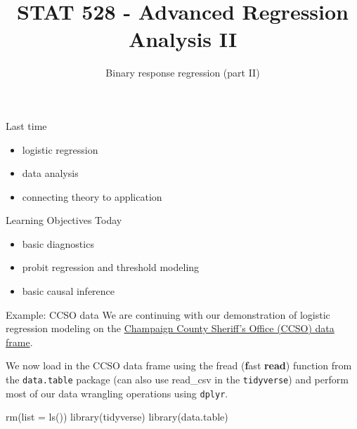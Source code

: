 \documentclass[
  ignorenonframetext,
]{beamer}
\title{STAT 528 - Advanced Regression Analysis II}
\author{Binary response regression (part II)}
\date{}
\institute{Daniel J. Eck\\
Department of Statistics\\
University of Illinois}
\newenvironment{Shaded}{\begin{snugshade}}{\end{snugshade}}
\newcommand{\AttributeTok}[1]{\textcolor[rgb]{0.77,0.63,0.00}{#1}}
\newcommand{\FunctionTok}[1]{\textcolor[rgb]{0.00,0.00,0.00}{#1}}
\newcommand{\NormalTok}[1]{#1}
\providecommand{\tightlist}{%
  \setlength{\itemsep}{0pt}\setlength{\parskip}{0pt}}
\begin{document}
\frame{\titlepage}

\begin{frame}
\newcommand{\R}{\mathbb{R}}
\newcommand{\Prob}{\mathbb{P}}
\newcommand{\Proj}{\textbf{P}}
\newcommand{\Hcal}{\mathcal{H}}
\newcommand{\rootn}{\sqrt{n}}
\newcommand{\p}{\mathbf{p}}
\newcommand{\E}{\text{E}}
\newcommand{\Var}{\text{Var}}
\newcommand{\Cov}{\text{Cov}}
\newcommand{\pibf}{\bm{\pi}}
\newcommand{\logit}{\text{logit}}

\newtheorem{cor}{Corollary}
\newtheorem{lem}{Lemma}
\newtheorem{thm}{Theorem}
\newtheorem{defn}{Definition}
\newtheorem{prop}{Proposition}
\end{frame}

\begin{frame}{Last time}
\protect\hypertarget{last-time}{}
\begin{itemize}
\tightlist
\item
  logistic regression
\item
  data analysis
\item
  connecting theory to application
\end{itemize}
\end{frame}

\begin{frame}{Learning Objectives Today}
\protect\hypertarget{learning-objectives-today}{}
\begin{itemize}
\tightlist
\item
  basic diagnostics
\item
  probit regression and threshold modeling
\item
  basic causal inference
\end{itemize}
\end{frame}

\begin{frame}[fragile]{Example: CCSO data}
\protect\hypertarget{example-ccso-data}{}
We are continuing with our demonstration of logistic regression modeling
on the \href{https://github.com/CUHackNight/JailData}{Champaign County
Sheriff's Office (CCSO) data frame}.

\vspace{12pt}

We now load in the CCSO data frame using the fread (\textbf{f}ast
\textbf{read}) function from the \texttt{data.table} package (can also
use read\_csv in the \texttt{tidyverse}) and perform most of our data
wrangling operations using \texttt{dplyr}.

\vspace{12pt}

\begin{Shaded}
\begin{Highlighting}[]
\FunctionTok{rm}\NormalTok{(}\AttributeTok{list =} \FunctionTok{ls}\NormalTok{())}
\FunctionTok{library}\NormalTok{(tidyverse)}
\FunctionTok{library}\NormalTok{(data.table)}
\end{Highlighting}
\end{Shaded}
\end{frame}
\end{document}
